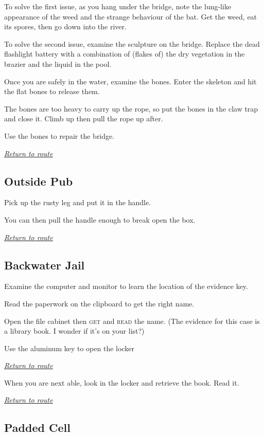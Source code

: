 \documentclass[a5paper]{extarticle}
\begin{document}
To solve the first issue, as you hang under the bridge,
note the lung-like appearance of the weed and the strange behaviour of the bat.
Get the weed, eat its spores, then go down into the river.

To solve the second issue, examine the sculpture on the bridge.
Replace the dead flashlight battery with a combination of
(flakes of) the dry vegetation in the brazier and the liquid in the pool.

Once you are safely in the water, examine the bones.
Enter the skeleton and hit the flat bones to release them.

The bones are too heavy to carry up the rope,
so put the bones in the claw trap and close it.
Climb up then pull the rope up after.

Use the bones to repair the bridge.

\hyperref[sec:route-2]{\emph{Return to route}}

\newpage
\subsection{Outside Pub}\label{sec:sol-Outside-Pub}

Pick up the rusty leg and put it in the handle.

You can then pull the handle enough to break open the box.

\hyperref[sec:route-2]{\emph{Return to route}}

\newpage
\subsection{Backwater Jail}\label{sec:sol-Backwater-Jail}

Examine the computer and monitor to learn the location of the evidence key.

Read the paperwork on the clipboard to get the right name.

Open the file cabinet then \textsc{get} and \textsc{read} the name.
(The evidence for this case is a library book. I wonder if it's on your list?)

Use the aluminum key to open the locker\xelip

\hyperref[sec:route-2]{\emph{Return to route}}

When you are next able, look in the locker and retrieve the book. Read it.

\hyperref[sec:route-2]{\emph{Return to route}}

\newpage
\subsection{Padded Cell}\label{sec:sol-Padded-Cell}
\end{document}
